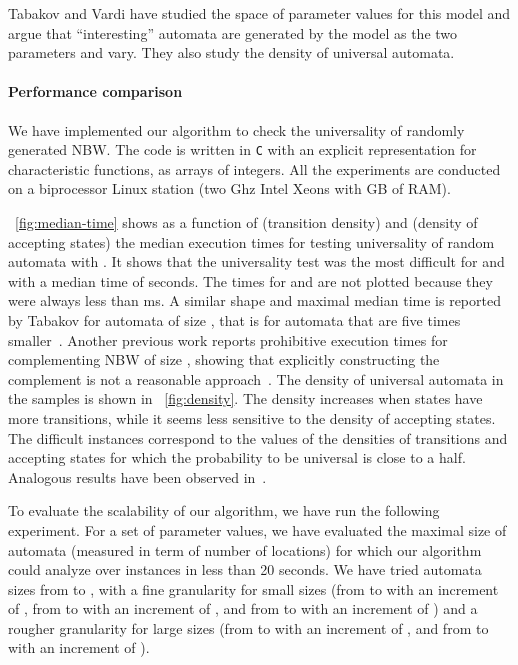 \documentclass{LMCS}
\begin{document}
Tabakov and Vardi have studied the space of parameter values for this
model and argue that ``interesting'' automata are generated by the
model as the two parameters  and  vary. They also study the 
density of universal automata.

\paragraph{{\bf Performance comparison}}
We have implemented our algorithm to check the universality of
randomly generated NBW. The code is written in {\tt C} with an
explicit representation for characteristic functions, as arrays of
integers.  All the experiments are conducted on a biprocessor Linux
station (two Ghz Intel Xeons with GB of RAM).

\figurename~\ref{fig:median-time} shows as a function of 
(transition density) and  (density of accepting states) the median
execution times for testing universality of  random automata with
.  It shows that the universality test was the most
difficult for  and  with a median time of  seconds.
The times for  and  are not plotted because they
were always less than ms.  A similar shape and maximal median
time is reported by Tabakov for automata
of size , that is for automata that are five times smaller~\cite{TabakovV07}.  Another previous work reports prohibitive execution times for
complementing NBW of size , showing that explicitly constructing
the complement is not a reasonable approach~\cite{GurumurthyKSV03}.
The density of universal automata in the samples is shown in \figurename~\ref{fig:density}.
The density increases when states have more transitions, while 
it seems less sensitive to the density of accepting states. The difficult 
instances correspond to the values of the densities of transitions and 
accepting states for which the probability to be universal is close to a half.
Analogous results have been observed in~\cite{TabakovV07}.


To evaluate the scalability of our algorithm, 
we have run the following experiment. For a set of
parameter values, we have evaluated the maximal size of automata
(measured in term of number of locations) for which our algorithm 
could analyze  over  instances in less than 20 seconds. 
We have tried automata sizes from  to , with a fine granularity
for small sizes (from  to  with an increment of , from 
 to  with an increment of , and from  to  
with an increment of ) and a rougher granularity for
large sizes (from  to  with an increment of , and
from  to  with an increment of ). 
\end{document}
